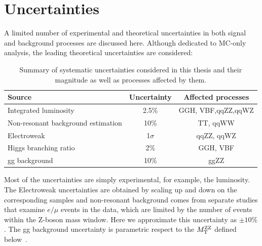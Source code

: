 \section{Uncertainties}
A limited number of experimental and theoretical uncertainties in both signal and background
processes are discussed here. Although dedicated to MC-only analysis, the leading theoretical
uncertainties are considered:
\begin{table}[hbt]
    \label{tab:uncertainty}
    \centering
\begin{tabular}{lcc}
\hline
Source                             & Uncertainty            & Affected processes \\ \hline
Integrated luminosity              & 2.5\%                  & GGH, VBF,qqZZ,qqWZ \\
Non-resonant background estimation & 10\%                   & TT, qqWW           \\
Electroweak                       & 1$\sigma$ & qqZZ, qqWZ         \\
Higgs branching ratio              & 2\%                    & GGH, VBF           \\
gg background              & 10\%                   & ggZZ
\end{tabular}
\caption{Summary of systematic uncertainties considered in this thesis and their
magnitude as well as processes affected by them.}
\label{tab:systs}
\end{table}

Most of the uncertainties are simply experimental, for example, the luminosity. The Electroweak
uncertainties are obtained by scaling up and down on the corresponding samples and non-resonant
background comes from separate studies that examine $e/\mu$ events in the data, which
are limited by the number of events within the Z-boson mass window. Here we approximate this 
uncertainty as $\pm 10\%$.  The gg background uncertainty is parametric respect to the $M_\mathrm{T}^{\mathrm{ZZ}}$ defined 
below~\cite{campbell_two_2016, caola_qcd_2015, caola_qcd_2015}.

